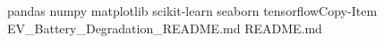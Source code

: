 pandas
numpy
matplotlib
scikit-learn
seaborn
tensorflowCopy-Item EV_Battery_Degradation_README.md README.md